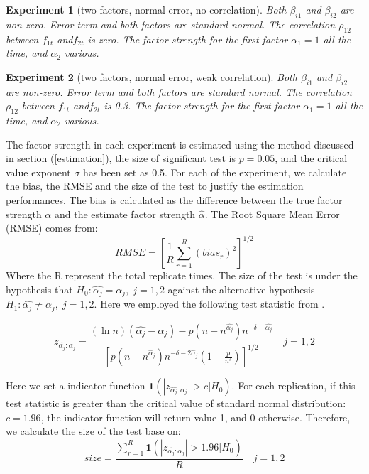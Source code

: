 \documentclass[12pt]{article}
\newtheorem{experiment}{Experiment}
\begin{document}
\begin{experiment}[two factors, normal error, no correlation]
Both $\beta_{i1}$ and $\beta_{i2}$ are non-zero. Error term and both factors are standard normal. The correlation $\rho_{12}$ between $f_{1t}$ and$f_{2t}$ is zero. 
The factor strength for the first factor $\alpha_1 = 1$ all the time, and $\alpha_2$ various.
\end{experiment}

\begin{experiment}[two factors, normal error, weak correlation]
Both $\beta_{i1}$ and $\beta_{i2}$ are non-zero. Error term  and both factors are standard normal. The correlation $\rho_{12}$ between $f_{1t}$ and$f_{2t}$ is 0.3.
The factor strength for the first factor $\alpha_1 = 1$ all the time, and $\alpha_2$ various.
\end{experiment}

The factor strength in each experiment is estimated using the method discussed in section (\ref{estimation}), the size of significant test is $p = 0.05$, and the critical value exponent $\sigma$ has been set as 0.5.
For each of the experiment, we calculate the bias, the RMSE and the size of the test to justify the estimation performances.
The bias is calculated as the difference between the true factor strength $\alpha$ and the estimate factor strength $\hat{\alpha}$.
The Root Square Mean Error (RMSE) comes from:
\[ RMSE =[\frac{1}{R}\sum_{r=1}^{R}(bias_r)^2 ]^{1/2}\]
Where the R represent the total replicate times.
The size of the test is under the hypothesis that $H_0: \hat{\alpha_j} = \alpha_j,\;j =1, 2$ against the alternative hypothesis $H_1:\hat{\alpha_j} \neq \alpha_j,\; j=1,2$.
Here we employed the following test statistic from .

\[  z_{\hat{\alpha_j}:\alpha_j} =\frac{(\ln n)\left(\hat{\alpha_j}-\alpha_{j}\right)-p\left(n-n^{\hat{\alpha_j}}\right) n^{-\delta-\hat{\alpha_j}}}{\left[p\left(n-n^{\hat{\alpha}_j}\right) n^{-\delta-2 \hat{\alpha}_j}\left(1-\frac{p}{n^{\delta}}\right)\right]^{1 / 2}}\quad j=1,2 \]

Here we set a indicator function $\mathbf{1}(|z_{\hat{\alpha_j}:\alpha_j} |>c|H_0)$.
For each replication, if this test statistic is greater than the critical value of standard normal distribution: $c = 1.96$, the indicator function will return value 1, and 0 otherwise.
Therefore, we calculate the size of the test base on:
\[ size = \frac{\sum_{r=1}^{R} \mathbf{1}(|z_{\hat{\alpha_j}:\alpha_j} |>1.96|H_0)}{R} \quad j =1,2\]
\end{document}
